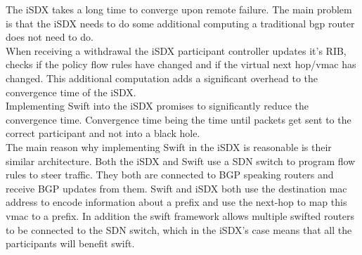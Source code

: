 The iSDX takes a long time to converge upon remote failure. The main problem is that the iSDX needs to do some additional computing a traditional bgp router does not need to do. \\
When receiving a withdrawal the iSDX participant controller updates it's RIB, checks if the policy flow rules have changed and if the virtual next hop/vmac has changed. This additional computation adds a significant overhead to the convergence time of the iSDX. \\
Implementing Swift into the iSDX promises to significantly reduce the convergence time. Convergence time being the time until packets get sent to the correct participant and not into a black hole. \\
The main reason why implementing Swift in the iSDX is reasonable is their similar architecture. Both the iSDX and Swift use a SDN switch to program flow rules to steer traffic. They both are connected to BGP speaking routers and receive BGP updates from them. Swift and iSDX both use the destination mac address to encode information about a prefix and use the next-hop to map this vmac to a prefix. In addition the swift framework allows multiple swifted routers to be connected to the SDN switch, which in the iSDX's case means that all the participants will benefit swift.





